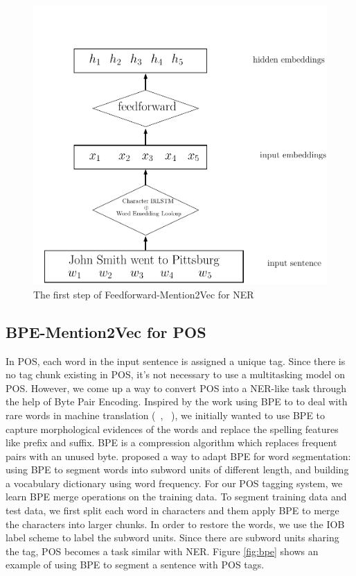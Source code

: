 \documentclass{sfuthesis}
\begin{document}
\begin{figure}
  \centering
  \includegraphics[scale=0.6]{mention2vec4.pdf}
 \caption{The first step of Feedforward-Mention2Vec for NER}
  \label{fig:mention2vec4}
\end{figure}

\subsection{BPE-Mention2Vec for POS}
In POS, each word in the input sentence is assigned a unique tag. Since there is no tag chunk existing in POS, it's not necessary to use a multitasking model on POS. However, we come up a way to convert POS into a NER-like task through the help of Byte Pair Encoding. Inspired by the work using BPE to to deal with rare words in machine translation (~\citeauthor{sennrich2015neural}, ~\citeyear{sennrich2015neural}), we initially wanted to use BPE to capture morphological evidences of the words and replace the spelling features like prefix and suffix. BPE is a compression algorithm which replaces frequent pairs with an unused byte. \cite{sennrich2015neural} proposed a way to adapt BPE for word segmentation: using BPE to segment words into subword units of different length, and building a vocabulary dictionary using word frequency. For our POS tagging system, we learn BPE merge operations on the training data. To segment training data and test data, we first split each word in characters and them apply BPE to merge the characters into larger chunks. In order to restore the words, we use the IOB label scheme to label the subword units. Since there are subword units sharing the tag, POS becomes a task similar with NER. Figure \ref{fig:bpe} shows an example of using BPE to segment a sentence with POS tags. 
\end{document}
